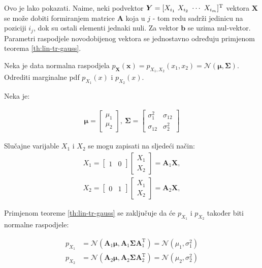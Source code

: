 Ovo je lako pokazati. Naime, neki podvektor $\bm Y = [X_{i_1}\ X_{i_2}\
	 \cdots\ X_{i_m}]^\text T$ vektora $\bm X$ se može dobiti formiranjem matrice
$\bm A$ koja u $j$ - tom redu sadrži jedinicu na poziciji $i_j$, dok su
ostali elementi jednaki nuli. Za vektor $\bm b$ se uzima nul-vektor.
Parametri raspodjele novodobijenog vektora se jednostavno određuju primjenom
teorema \ref{th:lin-tr-gauss}.

\begin{exmp}
	Neka je data normalna raspodjela $p_{\bm X}(\bm x) = p_{X_1,X_2}(x_1, x_2) =
	\mathcal{N}(\bm\mu, \bm \Sigma)$. Odrediti marginalne pdf $p_{X_1}(x)$ i
	$p_{X_2}(x)$.
\end{exmp}

Neka je:

\begin{eqnarray}
	\bm\mu = \left[\begin{array}{c}
		\mu_1 \\ \mu_2
	\end{array}\right],\ 
	\bm\Sigma = \left[\begin{array}{cc}
	  \sigma_1^2 & \sigma_{12} \\ \sigma_{12} & \sigma_2^2
	\end{array}\right]
\end{eqnarray}

Slučajne varijable $X_1$ i $X_2$ se mogu zapisati na sljedeći način:
\newcommand*{\vecrow}[2]{\left[\begin{array}{cc}#1&#2\end{array}\right]}
\newcommand*{\veccol}[2]{\left[\begin{array}{c}#1\\#2\end{array}\right]}
\begin{eqnarray}
	X_1 = \vecrow{1}{0} \veccol{X_1}{X_2} = \bm A_1 \bm X,
	\\
	X_2 = \vecrow{0}{1} \veccol{X_1}{X_2} = \bm A_2 \bm X,
\end{eqnarray}

Primjenom teoreme \ref{th:lin-tr-gauss} se zaključuje da će $p_{X_1}$ i
$p_{X_2}$ također biti normalne raspodjele:

\begin{align*}
	p_{X_1} &= \mathcal{N}(\bm A_1\bm\mu, \bm A_1 \bm\Sigma \bm A_1^\mathrm T)
		= \mathcal{N}(\mu_1, \sigma_1^2) \\
	p_{X_2} &= \mathcal{N}(\bm A_2\bm\mu, \bm A_2 \bm\Sigma \bm A_2^\mathrm T)
		= \mathcal{N}(\mu_2, \sigma_2^2)
\end{align*}

